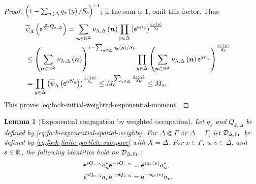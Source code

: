 \documentclass[11pt,a4paper]{article}
\theoremstyle{plain}
\newtheorem{lem}[thm]{Lemma}
\theoremstyle{definition}
\theoremstyle{remark}
\begin{document}
\begin{proof}
$\left( 1-\sum_{y\in \Delta}q_x \left( y \right)/S_b \right)^{-1}$; if the sum is $1$, omit this factor.
Thus
$$\begin{aligned}
&
\fun{\oastate[\overline{\psi}_{\Lambda}]}{
\napiernum^{\frac{a}{S_b}Q_{x,\Delta}}}
=
\sum_{\boldsymbol{n}\in\monnat^{\Delta}}
\fun{\nu_{\Lambda,\Delta}}{\boldsymbol{n}}
\prod_{y\in \Delta}
\rbk{\napiernum^{a n_y}}^{\frac{\fun{q_x}{y}}{S_b}}
\\ %
& \leq
\rbk{
\sum_{\boldsymbol{n}\in\monnat^{\Delta}}
\fun{\nu_{\Lambda,\Delta}}{\boldsymbol{n}}}^{
1-\sum_{y\in \Delta}\fun{q_x}{y}/S_b}
\prod_{y \in \Delta}
\rbk{
\sum_{\boldsymbol{n}\in\monnat^{\Delta}}
\fun{\nu_{\Lambda,\Delta}}{\boldsymbol{n}}
\napiernum^{a n_y}}^{\frac{\fun{q_x}{y}}{S_b}}
\\ %
& =
\prod_{y \in \Delta}
\rbk{
\fun{\oastate[\overline{\psi}_{\Lambda}]}{
\napiernum^{aN_y}}}^{\frac{\fun{q_x}{y}}{S_b}}
\leq
M_a^{\sum_{y\in \Delta} \frac{\fun{q_x}{y}}{S_b}}
\leq
M_a.
\end{aligned}$$
This proves \eqref{eq:fock-initial-weighted-exponential-moment}.
\end{proof}

\begin{lem}[Exponential conjugation by weighted occupation]
Let $q_x$ and $Q_{x,\Delta}$ be defined by
\eqref{eq:fock-exponential-spatial-weights}.
For $\Delta\Subset\Gamma$ or $\Delta=\Gamma$, let
$\sphilb{D}_{\Delta,\txtfin}$ be defined by
\eqref{eq:fock-finite-particle-subspace} with $X=\Delta$.
For $x\in\Gamma$, $u,v\in\Delta$, and $s\in\mathbb{R}$, the following identities hold on
$\sphilb{D}_{\Delta,\txtfin}$:
\begin{equation}
\begin{aligned}
\mathsf{e}^{sQ_{x,\Delta}}a_u^{\ast}\mathsf{e}^{-sQ_{x,\Delta}}
& =
\mathsf{e}^{sq_x \left( u \right)}a_u^{\ast},
\\
\mathsf{e}^{sQ_{x,\Delta}}a_v\mathsf{e}^{-sQ_{x,\Delta}}
& =
\mathsf{e}^{-sq_x \left( v \right)}a_v.
\end{aligned}
\label{eq:fock-exponential-creation-annihilation-conjugation}
\end{equation}
\end{lem}
\end{document}
